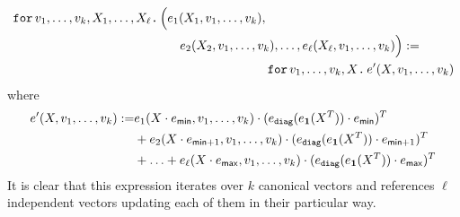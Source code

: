 \begin{align*}
    \texttt{for}\, v_1,\ldots, v_k,X_1,\ldots, X_\ell \texttt{.}\, \Big( &e_1(X_1,v_1,\ldots, v_k), \\
    &\hspace{1em}e_2(X_2,v_1,\ldots, v_k), \ldots, e_\ell(X_\ell,v_1,\ldots, v_k) \Big) := \\
    &\hspace{8em}\texttt{for}\, v_1,\ldots, v_k,X \texttt{.}\, e'(X,v_1,\ldots, v_k) \\
\end{align*}
where 
\begin{align*}
e'(X,v_1,\ldots,v_k):=&e_1(X\cdot e_{\mathsf{min}},v_1,\ldots,v_k)\cdot (e_{\texttt{diag}}(e_{\mathbf{1}}(X^T))\cdot e_{\mathsf{min}})^T \\
&+ e_2(X\cdot e_{\mathsf{min} + 1},v_1,\ldots,v_k)\cdot (e_{\texttt{diag}}(e_{\mathbf{1}}(X^T))\cdot e_{\mathsf{min} + 1})^T \\
&+ \ldots + e_\ell(X\cdot e_{\mathsf{max}},v_1,\ldots,v_k)\cdot (e_{\texttt{diag}}(e_{\mathbf{1}}(X^T))\cdot e_{\mathsf{max}})^T
\end{align*}
It is clear that this expression iterates over $k$ canonical vectors and references $\ell$ independent vectors updating each of them in their particular way.

